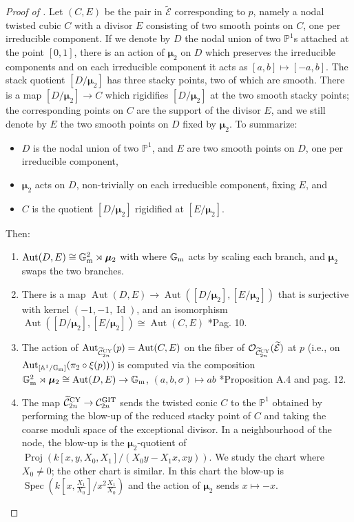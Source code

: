 \documentclass{amsart}
\newcommand{\bA}{\mathbb{A}}
\newcommand{\bG}{\mathbb{G}}
\newcommand{\bP}{\mathbb{P}}
\newcommand{\cC}{\mathcal{C}}
\newcommand{\cE}{\mathcal{E}}
\newcommand{\cO}{\mathcal{O}}
\newcommand{\spec}{\operatorname{Spec}}
\newcommand{\Proj}{\operatorname{Proj}}
\newcommand{\Gm}{\bG_{{\rm m}}}
\newcommand{\Aut}{\operatorname{Aut}}
\newcommand{\Id}{\operatorname{Id}}
\newcommand{\bmu}{\bm{\mu}}
\newcommand{\git}{{\rm GIT}}
\newcommand{\CY}{{\rm CY}}
\theoremstyle{definition}
\theoremstyle{definition}
\begin{document}
{\begin{proof}[Proof of ]
     Let $(C,E)$ be the pair in $\widetilde{\cE}$ corresponding to $p$, namely a nodal twisted cubic $C$ with a divisor $E$ consisting of two smooth points on $C$, one per irreducible component. If we denote by $D$ the nodal union of two $\bP^1$s attached at the point $[0,1]$, there is an action of $\bmu_2$ on $D$ which preserves the irreducible components and on each irreducible component it acts as $[a,b]\mapsto [-a,b]$. The stack quotient $[D/\bmu_2]$ has three stacky points, two of which are smooth. There is a map $[D/\bmu_2]\to C$ which rigidifies $[D/\bmu_2]$ at the two smooth stacky points; the corresponding points on $C$ are the support of the divisor $E$, and we still denote by $E$ the two smooth points on $D$ fixed by $\bmu_2$. To summarize:
     \begin{itemize}
         \item $D$ is the nodal union of two $\bP^1$, and $E $ are two smooth points on $D$, one per irreducible component,
         \item $\bmu_2$ acts on $D$, non-trivially on each irreducible component, fixing $E$, and
         \item $C$ is the quotient $[D/\bmu_2]$ rigidified at $[E/\bmu_2]$.
     \end{itemize}Then:
    \begin{enumerate}
\item $\Aut(D,E)\cong \Gm^2\rtimes \bmu_2$ with where $\Gm$ acts by scaling each branch, and $\bmu_2$ swaps the two branches. 
        \item There is a map $\Aut(D,E)\to \Aut([D/\bmu_2],[E/\bmu_2])$ that is surjective with kernel $(-1,-1,\Id)$, and an isomorphism $\Aut([D/\bmu_2],[E/\bmu_2])\cong\Aut(C,E)$ \cite{DLV}*{Pag. 10}.
        \item The action of $\Aut_{\widetilde{\cC}^{\CY}_{2n}}(p)=\Aut(C,E)$ on the fiber of $\cO_{\widetilde{\cC}^{\CY}_{2n}}(\widetilde{\cE})$ at $p$ (i.e., on $\Aut_{[\bA^1/\Gm]}(\pi_2\circ \xi (p))$) is computed via the composition $\Gm^2\rtimes \bmu_2\cong \Aut(D,E)\to \Gm$, $(a,b,\sigma)\mapsto ab$ \cite{DLV}*{Proposition A.4 and pag. 12}.
\item The map $\widetilde{\cC}^{\CY}_{2n}\to \cC^\git_{2n}$ sends the twisted conic $C$ to the $\bP^1$ obtained by performing the blow-up of the reduced stacky point of $C$ and taking the coarse moduli space of the exceptional divisor. In a neighbourhood of the node, the blow-up is the $\bmu_2$-quotient of $\Proj(k[x,y,X_0,X_1]/(X_0y-X_1x,xy))$. We study the chart where $X_0\neq 0$; the other chart is similar. In this chart the blow-up is $\spec(k[x,\frac{X_1}{X_0}]/x^2\frac{X_1}{X_0})$ and the action of $\bmu_2$ sends $x\mapsto -x$.

\end{enumerate}
\end{proof}}
\end{document}
